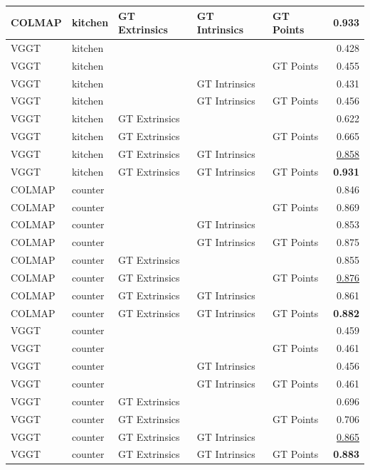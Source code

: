 \begin{table}[H]
\begin{tabular}{lllllr}
COLMAP & kitchen & GT Extrinsics & GT Intrinsics & GT Points & \textbf{0.933} \\
\midrule
VGGT & kitchen &  &  &  & 0.428 \\
VGGT & kitchen &  &  & GT Points & 0.455 \\
VGGT & kitchen &  & GT Intrinsics &  & 0.431 \\
VGGT & kitchen &  & GT Intrinsics & GT Points & 0.456 \\
VGGT & kitchen & GT Extrinsics &  &  & 0.622 \\
VGGT & kitchen & GT Extrinsics &  & GT Points & 0.665 \\
VGGT & kitchen & GT Extrinsics & GT Intrinsics &  & \underline{0.858} \\
VGGT & kitchen & GT Extrinsics & GT Intrinsics & GT Points & \textbf{0.931} \\
\midrule
COLMAP & counter &  &  &  & 0.846 \\
COLMAP & counter &  &  & GT Points & 0.869 \\
COLMAP & counter &  & GT Intrinsics &  & 0.853 \\
COLMAP & counter &  & GT Intrinsics & GT Points & 0.875 \\
COLMAP & counter & GT Extrinsics &  &  & 0.855 \\
COLMAP & counter & GT Extrinsics &  & GT Points & \underline{0.876} \\
COLMAP & counter & GT Extrinsics & GT Intrinsics &  & 0.861 \\
COLMAP & counter & GT Extrinsics & GT Intrinsics & GT Points & \textbf{0.882} \\
\midrule
VGGT & counter &  &  &  & 0.459 \\
VGGT & counter &  &  & GT Points & 0.461 \\
VGGT & counter &  & GT Intrinsics &  & 0.456 \\
VGGT & counter &  & GT Intrinsics & GT Points & 0.461 \\
VGGT & counter & GT Extrinsics &  &  & 0.696 \\
VGGT & counter & GT Extrinsics &  & GT Points & 0.706 \\
VGGT & counter & GT Extrinsics & GT Intrinsics &  & \underline{0.865} \\
VGGT & counter & GT Extrinsics & GT Intrinsics & GT Points & \textbf{0.883} \\
\bottomrule
\end{tabular}
\end{table}